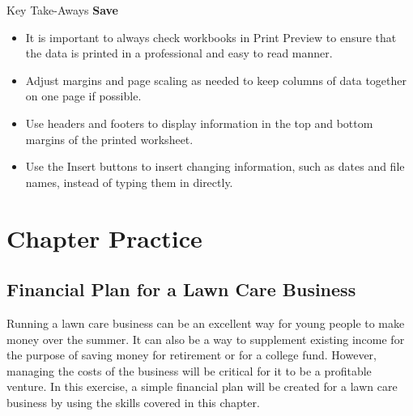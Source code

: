 \begin{center}
	\begin{tkwbox}{Key Take-Aways}
		\textbf{Save}
		\\
		\begin{itemize}
			\setlength{\itemsep}{0pt}
			\setlength{\parskip}{0pt}
			\setlength{\parsep}{0pt}
			
			\item It is important to always check workbooks in Print Preview to ensure that the data is printed in a professional and easy to read manner.
			\item Adjust margins and page scaling as needed to keep columns of data together on one page if possible.
			\item Use headers and footers to display information in the top and bottom margins of the printed worksheet.
			\item Use the Insert buttons to insert changing information, such as dates and file names, instead of typing them in directly.
			
		\end{itemize}
	\end{tkwbox}
\end{center}

\section{Chapter Practice}

\subsection{Financial Plan for a Lawn Care Business}

Running a lawn care business can be an excellent way for young people to make money over the summer. It can also be a way to supplement existing income for the purpose of saving money for retirement or for a college fund. However, managing the costs of the business will be critical for it to be a profitable venture. In this exercise, a simple financial plan will be created for a lawn care business by using the skills covered in this chapter.

